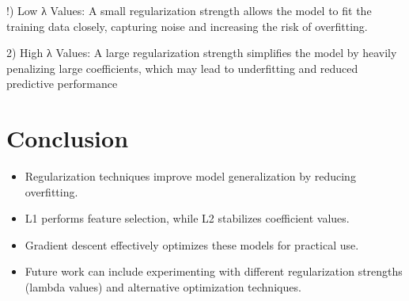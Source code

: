 \documentclass{article}
\begin{document}
!) Low λ Values: A small regularization strength allows the model to fit the training data closely, capturing noise and increasing the risk of overfitting.

2) High λ Values: A large regularization strength simplifies the model by heavily penalizing large coefficients, which may lead to underfitting and reduced predictive performance



\section{Conclusion}
\begin{itemize}
    \item Regularization techniques improve model generalization by reducing overfitting.
    \item L1 performs feature selection, while L2 stabilizes coefficient values.
    \item Gradient descent effectively optimizes these models for practical use.
    \item Future work can include experimenting with different regularization strengths (lambda values) and alternative optimization techniques.
\end{itemize}
\end{document}
